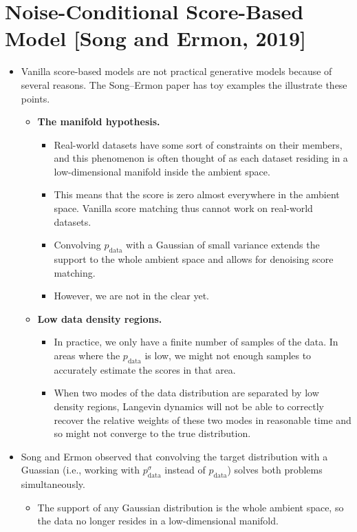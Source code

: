 \documentclass[10pt]{article}
\newcommand{\mrm}[1]{\mathrm{#1}}
\begin{document}
\section{Noise-Conditional Score-Based Model [Song and Ermon, 2019]}

\begin{itemize}
  \item Vanilla score-based models are not practical generative models because of several reasons. The Song--Ermon paper has toy examples the illustrate these points.
  \begin{itemize}
    \item {\bf The manifold hypothesis.}
    \begin{itemize}
      \item Real-world datasets have some sort of constraints on their members, and this phenomenon is often thought of as each dataset residing in a low-dimensional manifold inside the ambient space. 
      
      \item This means that the score is zero almost everywhere in the ambient space. Vanilla score matching thus cannot work on real-world datasets. 
      
      \item Convolving $p_{\mrm{data}}$ with a Gaussian of small variance extends the support to the whole ambient space and allows for denoising score matching. 
      
      \item However, we are not in the clear yet.
    \end{itemize}
    
    \item {\bf Low data density regions.}
    \begin{itemize}
      \item In practice, we only have a finite number of samples of the data. In areas where the $p_{\mrm{data}}$ is low, we might not enough samples to accurately estimate the scores in that area.
      
      \item When two modes of the data distribution are separated by low density regions, Langevin dynamics will not be able to correctly recover the relative weights of these two modes in reasonable time and so might not converge to the true distribution.
    \end{itemize}
  \end{itemize}

  \item Song and Ermon observed that convolving the target distribution with a Guassian (i.e., working with $p_{\mrm{data}}^\sigma$ instead of $p_{\mrm{data}}$) solves both problems simultaneously.
  \begin{itemize}
    \item The support of any Gaussian distribution is the whole ambient space, so the data no longer resides in a low-dimensional manifold.
    

\end{itemize}
\end{itemize}
\end{document}
